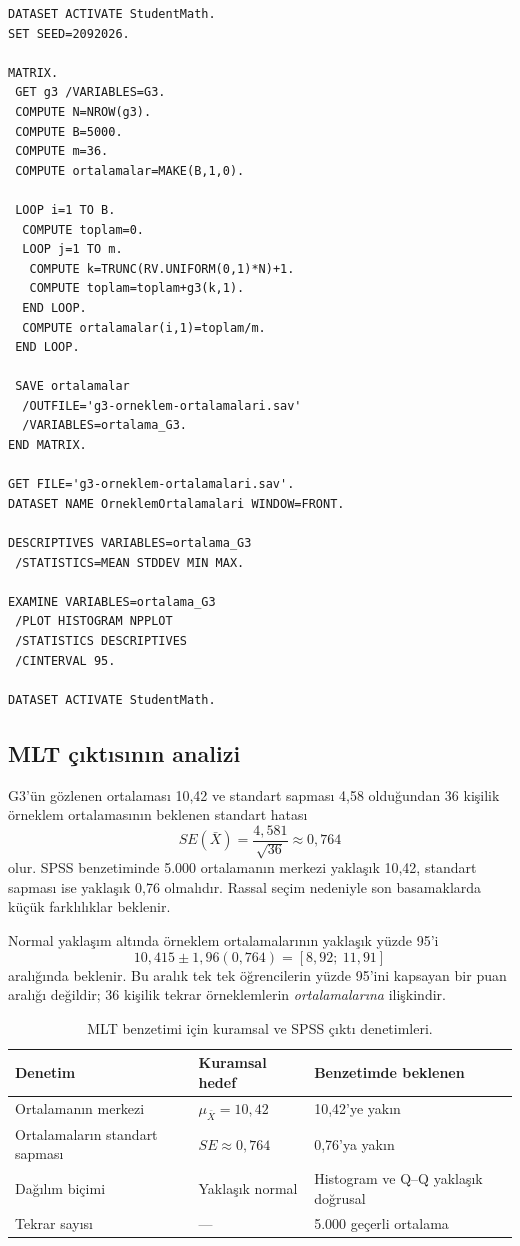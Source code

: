 \begin{lstlisting}[language={}]
DATASET ACTIVATE StudentMath.
SET SEED=2092026.

MATRIX.
 GET g3 /VARIABLES=G3.
 COMPUTE N=NROW(g3).
 COMPUTE B=5000.
 COMPUTE m=36.
 COMPUTE ortalamalar=MAKE(B,1,0).

 LOOP i=1 TO B.
  COMPUTE toplam=0.
  LOOP j=1 TO m.
   COMPUTE k=TRUNC(RV.UNIFORM(0,1)*N)+1.
   COMPUTE toplam=toplam+g3(k,1).
  END LOOP.
  COMPUTE ortalamalar(i,1)=toplam/m.
 END LOOP.

 SAVE ortalamalar
  /OUTFILE='g3-orneklem-ortalamalari.sav'
  /VARIABLES=ortalama_G3.
END MATRIX.

GET FILE='g3-orneklem-ortalamalari.sav'.
DATASET NAME OrneklemOrtalamalari WINDOW=FRONT.

DESCRIPTIVES VARIABLES=ortalama_G3
 /STATISTICS=MEAN STDDEV MIN MAX.

EXAMINE VARIABLES=ortalama_G3
 /PLOT HISTOGRAM NPPLOT
 /STATISTICS DESCRIPTIVES
 /CINTERVAL 95.

DATASET ACTIVATE StudentMath.
\end{lstlisting}

\subsection{MLT çıktısının analizi}

G3'ün gözlenen ortalaması 10,42 ve standart sapması 4,58 olduğundan 36 kişilik
örneklem ortalamasının beklenen standart hatası
\[
SE(\bar X)=\frac{4{,}581}{\sqrt{36}}\approx0{,}764
\]
olur. SPSS benzetiminde 5.000 ortalamanın merkezi yaklaşık 10,42, standart
sapması ise yaklaşık 0,76 olmalıdır. Rassal seçim nedeniyle son basamaklarda
küçük farklılıklar beklenir.

Normal yaklaşım altında örneklem ortalamalarının yaklaşık yüzde 95'i
\[
10{,}415\pm1{,}96(0{,}764)
=[8{,}92;\ 11{,}91]
\]
aralığında beklenir. Bu aralık tek tek öğrencilerin yüzde 95'ini kapsayan bir
puan aralığı değildir; 36 kişilik tekrar örneklemlerin \emph{ortalamalarına}
ilişkindir.

\begin{table}[htbp]
\centering
\caption{MLT benzetimi için kuramsal ve SPSS çıktı denetimleri.}
\begin{tabular}{@{}p{}p{}p{}@{}}
\toprule
Denetim & Kuramsal hedef & Benzetimde beklenen \\
\midrule
Ortalamanın merkezi & $\mu_{\bar X}=10{,}42$ & 10,42'ye yakın \\
Ortalamaların standart sapması & $SE\approx0{,}764$ & 0,76'ya yakın \\
Dağılım biçimi & Yaklaşık normal & Histogram ve Q--Q yaklaşık doğrusal \\
Tekrar sayısı & --- & 5.000 geçerli ortalama \\
\bottomrule
\end{tabular}
\end{table}

